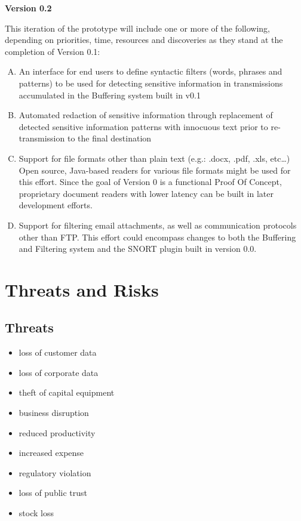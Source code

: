 \documentclass[dvipdfm]{book}
\begin{document}
\vspace{2mm}
\noindent
{\bf Version 0.2}

This iteration of the prototype will include one or more of the
following, depending on priorities, time, resources and discoveries as
they stand at the completion of Version 0.1:

\begin{enumerate}[A.]
\item An interface for end users to define syntactic filters (words,
phrases and patterns) to be used for detecting sensitive information
in transmissions accumulated in the Buffering system built in v0.1

\item Automated redaction of sensitive information through replacement of
detected sensitive information patterns with innocuous text prior to
re-transmission to the final destination

\item Support for file formats other than plain text (e.g.: .docx, .pdf,
.xls, etc…) Open source, Java-based readers for various file formats
might be used for this effort.  Since the goal of Version 0 is a
functional Proof Of Concept, proprietary document readers with lower
latency can be built in later development efforts.

\item Support for filtering email attachments, as well as communication
protocols other than FTP.  This effort could encompass changes to both
the Buffering and Filtering system and the SNORT plugin built in
version 0.0.
\end{enumerate}

\chapter{Threats and Risks}
\section{Threats}
\begin{itemize}
\item loss of customer data
\item loss of corporate data
\item theft of capital equipment
\item business disruption
\item reduced productivity
\item increased expense
\item regulatory violation
\item loss of public trust
\item stock loss
\end{itemize}
\end{document}
